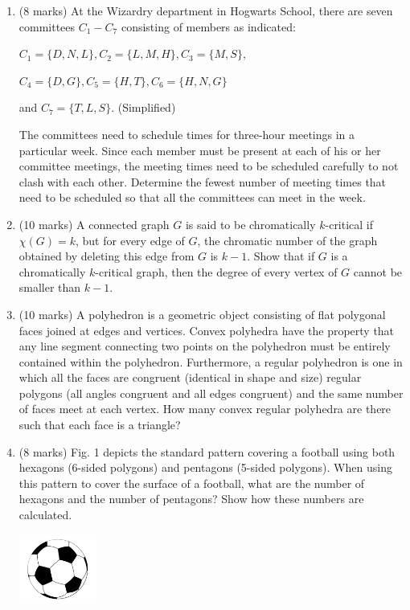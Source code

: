 \documentclass{article}
\begin{document}
\begin{enumerate}[label=(\alph*)]
    \item (8 marks) At the Wizardry department in Hogwarts School, there are seven committees $C_1 - C_7$ consisting of members as indicated:

          $C_1 = \{D, N, L\}, C_2 = \{L, M, H\}, C_3 = \{M, S\},$

          $C_4 = \{D, G\}, C_5 = \{H, T\}, C_6 = \{H, N, G\}$

          and $C_7 = \{T, L, S\}$. (Simplified)

          The committees need to schedule times for three-hour meetings in a particular week. Since each member must be present at each of his or her committee meetings, the meeting times need to be scheduled carefully to not clash with each other. Determine the fewest number of meeting times that need to be scheduled so that all the committees can meet in the week.
    \item (10 marks) A connected graph $G$ is said to be chromatically $k$-critical if $\chi(G) = k$, but for every edge of $G$, the chromatic number of the graph obtained by deleting this edge from $G$ is $k-1$. Show that if $G$ is a chromatically $k$-critical graph, then the degree of every vertex of $G$ cannot be smaller than $k-1$.
    \item (10 marks) A polyhedron is a geometric object consisting of ﬂat polygonal faces joined at edges and vertices. Convex polyhedra have the property that any line segment connecting two points on the polyhedron must be entirely contained within the polyhedron. Furthermore, a regular polyhedron is one in which all the faces are congruent (identical in shape and size) regular polygons (all angles congruent and all edges congruent) and the same number of faces meet at each vertex.
          How many convex regular polyhedra are there such that each face is a triangle?
    \item (8 marks) Fig. 1 depicts the standard pattern covering a football using both hexagons (6-sided polygons) and pentagons (5-sided polygons).
          When using this pattern to cover the surface of a football, what are the number of hexagons and the number of pentagons? Show how these numbers are calculated.

          \includegraphics[width=0.2\textwidth]{5-fig-1.png}
\end{enumerate}
\end{document}
